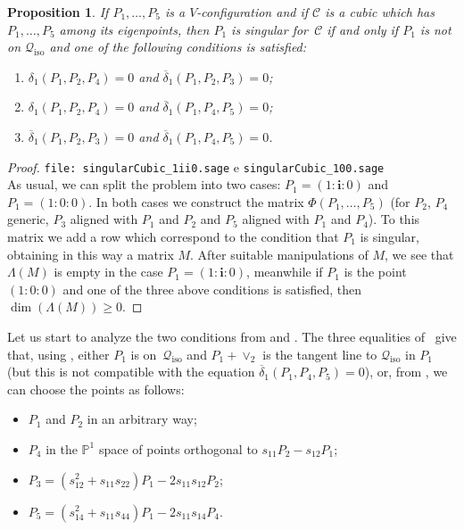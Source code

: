 \documentclass{amsart}
\theoremstyle{plain}
\newtheorem{prop}[lemma]{Proposition}
\theoremstyle{definition}
\newcommand{\iso}{\mathcal{Q}_{\mathrm{iso}}}
\newcommand{\iii}{\textbf{i}}
\begin{document}
\begin{prop}
\label{proposition:P1_sing}
If $P_1, \dots, P_5$ is a $V$-configuration and if
$\mathcal{C}$ is a cubic which
has $P_1, \dots, P_5$ among its eigenpoints, then $P_1$ is
singular for~$\mathcal{C}$ if
and only if $P_1$ is not on $\iso$ and one of the following conditions
is satisfied:
\begin{enumerate}
\item $\delta_1(P_1, P_2, P_4) = 0$ and $\overline{\delta}_1(P_1, P_2, P_3) = 0$;
\item $\delta_1(P_1, P_2, P_4) = 0$ and $\overline{\delta}_1(P_1, P_4, P_5) = 0$;
\item $\overline{\delta}_1(P_1, P_2, P_3) = 0$ and
$\overline{\delta}_1(P_1, P_4, P_5) = 0$.
\end{enumerate}
\end{prop}
\begin{proof}
\verb+file: singularCubic_1ii0.sage+ e \verb+singularCubic_100.sage+\\
As usual, we can split the problem into two cases: $P_1 = (1: \iii: 0)$
and $P_1 = (1: 0: 0)$. In both cases we construct the matrix
$\Phi(P_1, \dots, P_5)$ (for $P_2$, $P_4$ generic, $P_3$ aligned with
$P_1$ and $P_2$ and $P_5$ aligned with $P_1$ and $P_4$). To this matrix we add
a row which correspond to the condition that $P_1$ is singular, obtaining
in this way a matrix $M$. After
suitable manipulations of $M$, we see that $\Lambda(M)$ is empty
in the case $P_1=(1: \iii: 0)$, meanwhile if $P_1$ is the point $(1:0:0)$
and one of the three above conditions is satisfied, then
$\dim(\Lambda(M)) \geq 0$.
\end{proof}

Let us start to analyze the two conditions from  and .
The three equalities of~ give that,
using , either $P_1$ is on~$\iso$ and
$P_1+ \vee _2$ is the tangent line to $\iso$ in $P_1$ (but this is not compatible
with the equation $\overline{\delta}_1(P_1, P_4, P_5)=0$), or,
from , we can choose the points as follows:
%
\begin{itemize}
\item $P_1$ and $P_2$ in an arbitrary way;
\item $P_4$ in the $\mathbb{P}^1$
space of points orthogonal to $s_{11}P_2-s_{12}P_1$;
\item $P_3 = (s_{12}^2+s_{11}s_{22})P_1-2s_{11}s_{12}P_2$;
\item $P_5 = (s_{14}^2+s_{11}s_{44})P_1-2s_{11}s_{14}P_4$.
\end{itemize}
%
\end{document}
